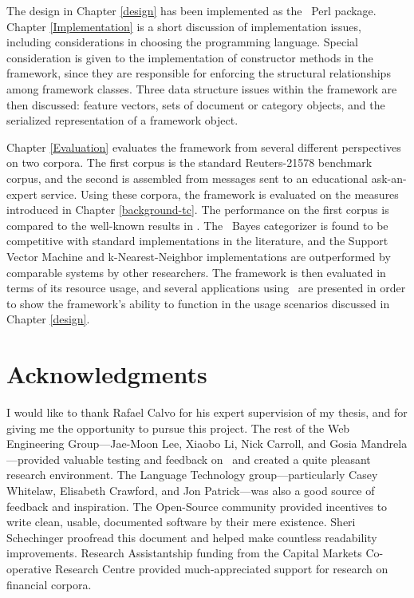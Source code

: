 The design in Chapter \ref{design} has been implemented as the \aicat\
Perl package.  Chapter \ref{Implementation} is a short discussion of
implementation issues, including considerations in choosing the
programming language.  Special consideration is given to the
implementation of constructor methods in the framework, since they are
responsible for enforcing the structural relationships among framework
classes.  Three data structure issues within the framework are then
discussed: feature vectors, sets of document or category objects, and
the serialized representation of a framework object.

Chapter \ref{Evaluation} evaluates the framework from several
different perspectives on two corpora.  The first corpus is the
standard Reuters-21578 benchmark corpus, and the second is assembled
from messages sent to an educational ask-an-expert service.  Using
these corpora, the framework is evaluated on the measures introduced
in Chapter \ref{background-tc}.  The performance on the first corpus
is compared to the well-known results in \cite{yang:99}.  The \naive\
Bayes categorizer is found to be competitive with standard
implementations in the literature, and the Support Vector Machine and
k-Nearest-Neighbor implementations are outperformed by comparable
systems by other researchers.  The framework is then evaluated in
terms of its resource usage, and several applications using \aicat\
are presented in order to show the framework's ability to function in
the usage scenarios discussed in Chapter \ref{design}.


\chapter{Acknowledgments}

I would like to thank Rafael Calvo for his expert supervision of my
thesis, and for giving me the opportunity to pursue this project.  The
rest of the Web Engineering Group---Jae-Moon Lee, Xiaobo Li, Nick
Carroll, and Gosia Mandrela---provided valuable testing and feedback
on \aicat\ and created a quite pleasant research environment.  The
Language Technology group---particularly Casey Whitelaw, Elisabeth
Crawford, and Jon Patrick---was also a good source of feedback and
inspiration.  The Open-Source community provided incentives to write
clean, usable, documented software by their mere existence.  Sheri
Schechinger proofread this document and helped make countless
readability improvements.  Research
Assistantship funding from the Capital Markets Co-operative Research
Centre provided much-appreciated support for research on financial
corpora.

